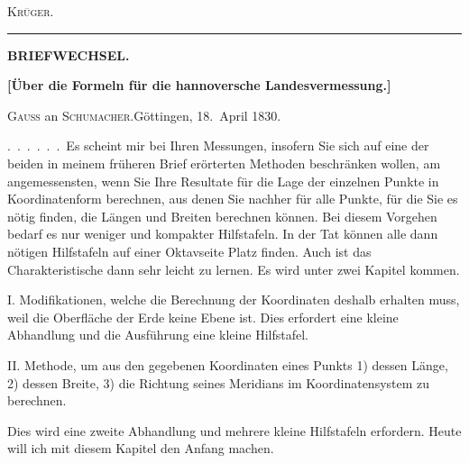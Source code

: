 \begin{flushright}\textsc{Krüger.}\end{flushright}
\begin{center}\rule{7cm}{.5pt}\end{center}
\par\endgroup
\clearpage
\vspace*{1.3cm}
\begin{center}
{\Large\bfseries BRIEFWECHSEL.}\par
\vspace{1.7cm}
{\large\bfseries [Über die Formeln für die hannoversche Landesvermessung.]}\par
\bigskip
\textsc{Gauss} an \textsc{Schumacher}.\quad Göttingen, 18.~April 1830.
\end{center}
\medskip
.\ .\ .\ .\ .\ .\ Es scheint mir bei Ihren Messungen, insofern Sie sich auf eine der beiden in meinem früheren Brief erörterten Methoden beschränken wollen, am angemessensten, wenn Sie Ihre Resultate für die Lage der einzelnen Punkte in Koordinatenform berechnen, aus denen Sie nachher für alle Punkte, für die Sie es nötig finden, die Längen und Breiten berechnen können. Bei diesem Vorgehen bedarf es nur weniger und kompakter Hilfstafeln. In der Tat können alle dann nötigen Hilfstafeln auf einer Oktavseite Platz finden. Auch ist das Charakteristische dann sehr leicht zu lernen. Es wird unter zwei Kapitel kommen.

I. Modifikationen, welche die Berechnung der Koordinaten deshalb erhalten muss, weil die Oberfläche der Erde keine Ebene ist. Dies erfordert eine kleine Abhandlung und die Ausführung eine kleine Hilfstafel.

II. Methode, um aus den gegebenen Koordinaten eines Punkts 1) dessen Länge, 2) dessen Breite, 3) die Richtung seines Meridians im Koordinatensystem zu berechnen.

Dies wird eine zweite Abhandlung und mehrere kleine Hilfstafeln erfordern. Heute will ich mit diesem Kapitel den Anfang machen.

